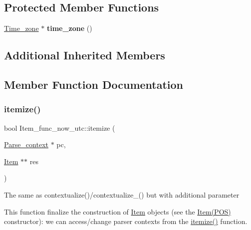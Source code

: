 \subsection*{Protected Member Functions}
\begin{DoxyCompactItemize}
\item 
\mbox{\label{classItem__func__now__utc_af34b450f746caa0aba9e54ace323af90}} 
\mbox{\hyperlink{classTime__zone}{Time\+\_\+zone}} $\ast$ {\bfseries time\+\_\+zone} ()
\end{DoxyCompactItemize}
\subsection*{Additional Inherited Members}


\subsection{Member Function Documentation}
\mbox{\label{classItem__func__now__utc_ac48fbe69e363d5a82f3debc0c90eb8c6}} 
\subsubsection{\texorpdfstring{itemize()}{itemize()}}
{\footnotesize\ttfamily bool Item\+\_\+func\+\_\+now\+\_\+utc\+::itemize (\begin{DoxyParamCaption}\item[{\mbox{\hyperlink{structParse__context}{Parse\+\_\+context}} $\ast$}]{pc,  }\item[{\mbox{\hyperlink{classItem}{Item}} $\ast$$\ast$}]{res }\end{DoxyParamCaption})\hspace{0.3cm}{\ttfamily [virtual]}}

The same as contextualize()/contextualize\+\_\+() but with additional parameter

This function finalize the construction of \mbox{\hyperlink{classItem}{Item}} objects (see the \mbox{\hyperlink{classItem}{Item(\+P\+O\+S)}} constructor)\+: we can access/change parser contexts from the \mbox{\hyperlink{classItem__func__now__utc_ac48fbe69e363d5a82f3debc0c90eb8c6}{itemize()}} function.


